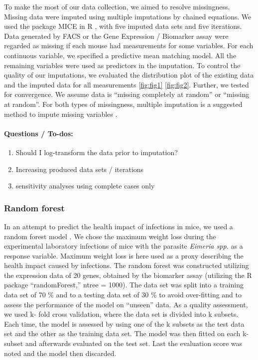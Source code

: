 \documentclass[webpdf,large,contemporary,namedate]{oup-authoring-template}
\providecommand{\tightlist}{%
  \setlength{\itemsep}{0pt}\setlength{\parskip}{0pt}}
\theoremstyle{thmstyleone}
\theoremstyle{thmstyletwo}
\theoremstyle{thmstylethree}
\begin{document}
To make the most of our data collection, we aimed to resolve
missingness. Missing data were imputed using multiple imputations by
chained equations. We used the package MICE in R \citet{van2011mice},
with five imputed data sets and five iterations. Data generated by FACS
or the Gene Expression / Biomarker assay were regarded as missing if
each mouse had measurements for some variables. For each continuous
variable, we specified a predictive mean matching model. All the
remaining variables were used as predictors in the imputation. To
control the quality of our imputations, we evaluated the distribution
plot of the existing data and the imputed data for all measurements
\ref{fig:fig1} \ref{fig:fig2}. Further, we tested for convergence. We
assume data is ``missing completely at random'' or ``missing at
random''. For both types of missingness, multiple imputation is a
suggested method to impute missing variables \citet{van2018flexible}.

\hypertarget{questions-to-dos}{%
\paragraph{Questions / To-dos:}\label{questions-to-dos}}

\begin{enumerate}
\def\labelenumi{\arabic{enumi}.}
\tightlist
\item
  Should I log-transform the data prior to imputation?
\item
  Increasing produced data sets / iterations
\item
  sensitivity analyses using complete cases only
\end{enumerate}

\hypertarget{random-forest}{%
\subsubsection{Random forest}\label{random-forest}}

In an attempt to predict the health impact of infections in mice, we
used a random forest model \citet{breiman2001random}. We chose the
maximum weight loss during the experimental laboratory infections of
mice with the parasite \emph{Eimeria spp.} as a response variable.
Maximum weight loss is here used as a proxy describing the health impact
caused by infections. The random forest was constructed utilizing the
expression data of 20 genes, obtained by the biomarker assay (utilizing
the R package ``randomForest,'' ntree = 1000). The data set was split
into a training data set of 70 \% and to a testing data set of 30 \% to
avoid over-fitting and to assess the performance of the model on
``unseen'' data. As a quality assessment, we used k- fold cross
validation, where the data set is divided into k subsets. Each time, the
model is assessed by using one of the k subsets as the test data set and
the other as the training data set. The model was then fitted on each
k-subset and afterwards evaluated on the test set. Last the evaluation
score was noted and the model then discarded.
\end{document}
